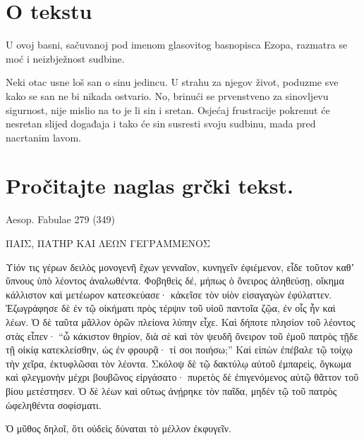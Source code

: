 


\section*{O tekstu}

U ovoj basni, sačuvanoj pod imenom glasovitog basnopisca Ezopa, razmatra se moć i neizbježnost sudbine.

Neki otac usne loš san o sinu jedincu. U strahu za njegov život, poduzme sve kako se san ne bi nikada ostvario. No, brinući se prvenstveno za sinovljevu sigurnost, nije mislio na to je li sin i sretan. Osjećaj frustracije pokrenut će nesretan slijed događaja i tako će sin susresti svoju sudbinu, mada pred nacrtanim lavom.


\section*{Pročitajte naglas grčki tekst.}

Aesop. Fabulae 279 (349)


\medskip


{\large

\begin{greek}

\noindent ΠΑΙΣ, ΠΑΤΗΡ ΚΑΙ ΛΕΩΝ ΓΕΓΡΑΜΜΕΝΟΣ

\medskip

\noindent Υἱόν τις γέρων δειλὸς μονογενῆ ἔχων γενναῖον, κυνηγεῖν ἐφιέμενον, εἶδε τοῦτον καθʼ ὕπνους ὑπὸ λέοντος ἀναλωθέντα. Φοβηθεὶς δέ, μήπως ὁ ὄνειρος ἀληθεύσῃ, οἴκημα κάλλιστον καὶ μετέωρον κατεσκεύασε· κἀκεῖσε τὸν υἱὸν εἰσαγαγὼν ἐφύλαττεν. Ἐζωγράφησε δὲ ἐν τῷ οἰκήματι πρὸς τέρψιν τοῦ υἱοῦ παντοῖα ζῷα, ἐν οἷς ἦν καὶ λέων. Ὁ δὲ ταῦτα μᾶλλον ὁρῶν πλείονα λύπην εἶχε. Καὶ δήποτε πλησίον τοῦ λέοντος στὰς εἶπεν· ``ὦ κάκιστον θηρίον, διὰ σὲ καὶ τὸν ψευδῆ ὄνειρον τοῦ ἐμοῦ πατρὸς τῇδε τῇ οἰκίᾳ κατεκλείσθην, ὡς ἐν φρουρᾷ· τί σοι ποιήσω;'' Καὶ εἰπὼν ἐπέβαλε τῷ τοίχῳ τὴν χεῖρα, ἐκτυφλῶσαι τὸν λέοντα. Σκόλοψ δὲ τῷ δακτύλῳ αὐτοῦ ἐμπαρεὶς, ὄγκωμα καὶ φλεγμονὴν μέχρι βουβῶνος εἰργάσατο· πυρετὸς δὲ ἐπιγενόμενος αὐτῷ θᾶττον τοῦ βίου μετέστησεν. Ὁ δὲ λέων καὶ οὕτως ἀνῄρηκε τὸν παῖδα, μηδὲν τῷ τοῦ πατρὸς ὠφεληθέντα σοφίσματι.

Ὁ μῦθος δηλοῖ, ὅτι οὐδεὶς δύναται τὸ μέλλον ἐκφυγεῖν.

\end{greek}

}


